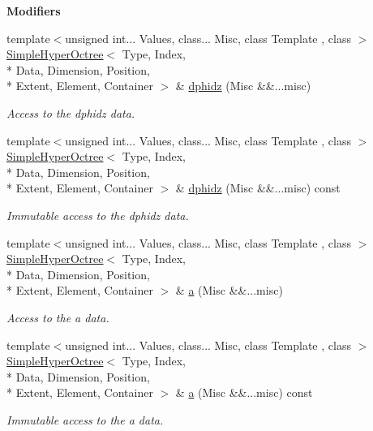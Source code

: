 \begin{Indent}{\bf Modifiers}
\begin{DoxyCompactItemize}
{\footnotesize template$<$unsigned int... Values, class... Misc, class Template , class $>$ }\\\hyperlink{exceptionmagrathea_1_1SimpleHyperOctree}{Simple\-Hyper\-Octree}$<$ Type, Index, \\*
Data, Dimension, Position, \\*
Extent, Element, Container $>$ \& \hyperlink{exceptionmagrathea_1_1SimpleHyperOctree_a00496e0344462770db3a96e6425a20fd}{dphidz} (Misc \&\&...misc)
\begin{DoxyCompactList}\small\item\em Access to the dphidz data. \end{DoxyCompactList}\item 
{\footnotesize template$<$unsigned int... Values, class... Misc, class Template , class $>$ }\\\hyperlink{exceptionmagrathea_1_1SimpleHyperOctree}{Simple\-Hyper\-Octree}$<$ Type, Index, \\*
Data, Dimension, Position, \\*
Extent, Element, Container $>$ \& \hyperlink{exceptionmagrathea_1_1SimpleHyperOctree_af1abc2df7ed7128905f194c26e9de500}{dphidz} (Misc \&\&...misc) const 
\begin{DoxyCompactList}\small\item\em Immutable access to the dphidz data. \end{DoxyCompactList}\item 
{\footnotesize template$<$unsigned int... Values, class... Misc, class Template , class $>$ }\\\hyperlink{exceptionmagrathea_1_1SimpleHyperOctree}{Simple\-Hyper\-Octree}$<$ Type, Index, \\*
Data, Dimension, Position, \\*
Extent, Element, Container $>$ \& \hyperlink{exceptionmagrathea_1_1SimpleHyperOctree_a6347676c2f8a5939780b1dcedb48a7e4}{a} (Misc \&\&...misc)
\begin{DoxyCompactList}\small\item\em Access to the a data. \end{DoxyCompactList}\item 
{\footnotesize template$<$unsigned int... Values, class... Misc, class Template , class $>$ }\\\hyperlink{exceptionmagrathea_1_1SimpleHyperOctree}{Simple\-Hyper\-Octree}$<$ Type, Index, \\*
Data, Dimension, Position, \\*
Extent, Element, Container $>$ \& \hyperlink{exceptionmagrathea_1_1SimpleHyperOctree_a1f404f155309831822ab1a8585ff540a}{a} (Misc \&\&...misc) const 
\begin{DoxyCompactList}\small\item\em Immutable access to the a data. \end{DoxyCompactList}\end{DoxyCompactItemize}
\end{Indent}
